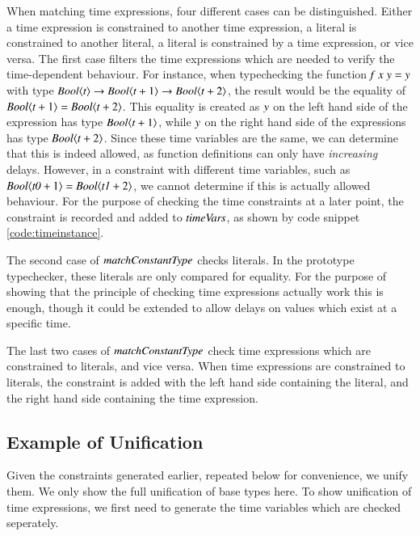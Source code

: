 When matching time expressions, four different cases can be distinguished.
Either a time expression is constrained to another time expression, a literal is constrained to another literal, a literal is constrained by a time expression, or vice versa.
The first case filters the time expressions which are needed to verify the time-dependent behaviour.
For instance, when typechecking the function \ensuremath{\Varid{f}\;\Varid{x}\;\Varid{y}\mathrel{=}\Varid{y}} with type \ensuremath{\Conid{Bool}\langle\Varid{t}\rangle\to \Conid{Bool}\langle\Varid{t}\mathbin{+}\mathrm{1}\rangle\to \Conid{Bool}\langle\Varid{t}\mathbin{+}\mathrm{2}\rangle}, the result would be the equality of \ensuremath{\Conid{Bool}\langle\Varid{t}\mathbin{+}\mathrm{1}\rangle\mathrel{=}\Conid{Bool}\langle\Varid{t}\mathbin{+}\mathrm{2}\rangle}.
This equality is created as \ensuremath{\Varid{y}} on the left hand side of the expression has type \ensuremath{\Conid{Bool}\langle\Varid{t}\mathbin{+}\mathrm{1}\rangle}, while \ensuremath{\Varid{y}} on the right hand side of the expressions has type \ensuremath{\Conid{Bool}\langle\Varid{t}\mathbin{+}\mathrm{2}\rangle}.
Since these time variables are the same, we can determine that this is indeed allowed, as function definitions can only have \textit{increasing} delays.
However, in a constraint with different time variables, such as \ensuremath{\Conid{Bool}\langle\Varid{t0}\mathbin{+}\mathrm{1}\rangle\mathrel{=}\Conid{Bool}\langle\Varid{t1}\mathbin{+}\mathrm{2}\rangle}, we cannot determine if this is actually allowed behaviour.
For the purpose of checking the time constraints at a later point, the constraint is recorded and added to \ensuremath{\Varid{timeVars}}, as shown by code snippet \ref{code:timeinstance}.

The second case of \ensuremath{\Varid{matchConstantType}} checks literals. 
In the prototype typechecker, these literals are only compared for equality.
For the purpose of showing that the principle of checking time expressions actually work this is enough, though it could be extended to allow delays on values which exist at a specific time.

The last two cases of \ensuremath{\Varid{matchConstantType}} check time expressions which are constrained to literals, and vice versa.
When time expressions are constrained to literals, the constraint is added with the left hand side containing the literal, and the right hand side containing the time expression.

\subsection{Example of Unification}
Given the constraints generated earlier, repeated below for convenience, we unify them.
We only show the full unification of base types here.
To show unification of time expressions, we first need to generate the time variables which are checked seperately.

